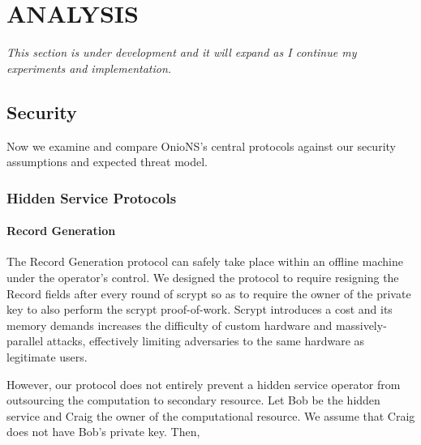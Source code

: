 
\chapter{ANALYSIS}
\label{Chapter:Analysis}

\emph{This section is under development and it will expand as I continue my experiments and implementation.}

\section{Security}

Now we examine and compare OnioNS's central protocols against our security assumptions and expected threat model.

\subsection{Hidden Service Protocols}

\subsubsection{Record Generation}

The Record Generation protocol can safely take place within an offline machine under the operator's control. We designed the protocol to require resigning the Record fields after every round of scrypt so as to require the owner of the private key to also perform the scrypt proof-of-work. Scrypt introduces a cost and its memory demands increases the difficulty of custom hardware and massively-parallel attacks, effectively limiting adversaries to the same hardware as legitimate users. 

However, our protocol does not entirely prevent a hidden service operator from outsourcing the computation to secondary resource. Let Bob be the hidden service and Craig the owner of the computational resource. We assume that Craig does not have Bob's private key. Then,

